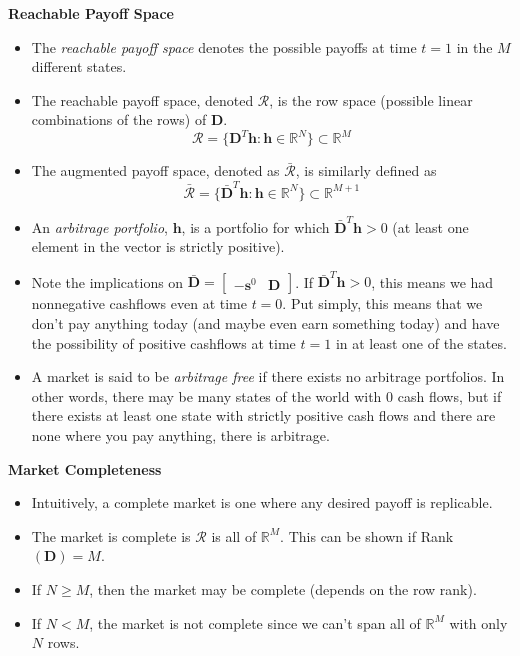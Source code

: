 \documentclass[11pt]{article}
\begin{document}
\textbf{Reachable Payoff Space}
\begin{itemize}
    \item The \textit{reachable payoff space} denotes the possible payoffs at time $t=1$ in the 
    $M$ different states. 
    \item The reachable payoff space, denoted $\mathcal{R}$, is the row space (possible linear 
    combinations of the rows) of $\boldsymbol{D}$.
    \[\mathcal{R} = \{\boldsymbol{D}^T \boldsymbol{h}: \boldsymbol{h} \in \mathbb{R}^N\} 
    \subset \mathbb{R}^M\]
    \item The augmented payoff space, denoted as $\mathcal{\bar{R}}$, is similarly defined as
    \[\mathcal{\bar{R}} = \{\boldsymbol{\bar{D}}^T \boldsymbol{h}: \boldsymbol{h} \in 
    \mathbb{R}^N\} \subset \mathbb{R}^{M+1}\]
    \item An \textit{arbitrage portfolio}, $\boldsymbol{h}$, is a portfolio for which 
    $\boldsymbol{\bar{D}}^T \boldsymbol{h} > 0$ (at least one element in the vector is strictly 
    positive). 
    \item Note the implications on $\bar{\boldsymbol{D}} = \begin{bmatrix} -\boldsymbol{s}^0 & 
    \boldsymbol{D} \end{bmatrix}$. If $\boldsymbol{\bar{D}}^T \boldsymbol{h} > 0$, this means we 
    had nonnegative cashflows even at time $t=0$. Put simply, this means that we don't pay 
    anything today (and maybe even earn something today) and have the possibility of positive 
    cashflows at time $t=1$ in at least one of the states. 
    \item A market is said to be \textit{arbitrage free} if there exists no arbitrage 
    portfolios. In other words, there may be many states of the world with 0 cash flows, but if
    there exists at least one state with strictly positive cash flows and there are none where 
    you pay anything, there is arbitrage.
\end{itemize}

\textbf{Market Completeness}
\begin{itemize}
    \item Intuitively, a complete market is one where any desired payoff is replicable.
    \item The market is complete is $\mathcal{R}$ is all of $\mathbb{R}^M$. This can be shown 
    if Rank$(\boldsymbol{D}) = M$.
    \item If $N \ge M$, then the market may be complete (depends on the row rank).
    \item If $N < M$, the market is not complete since we can't span all of $\mathbb{R}^M$ with 
    only $N$ rows.
\end{itemize}
\end{document}
